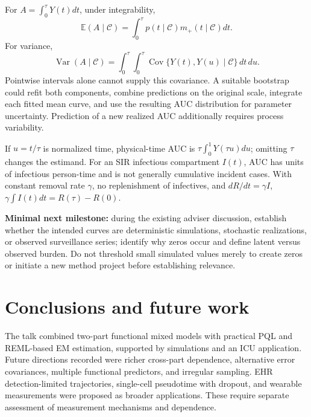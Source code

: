 \documentclass[11pt]{article}
\newcommand{\E}{\mathbb E}\newcommand{\Var}{\operatorname{Var}}\newcommand{\logit}{\operatorname{logit}}
\begin{document}
For $A=\int_0^\tau Y(t)dt$, under integrability,
\[
\E(A\mid\mathcal C)=\int_0^\tau p(t\mid\mathcal C)m_+(t\mid\mathcal C)dt.
\]
For variance,
\[
\Var(A\mid\mathcal C)=\int_0^\tau\int_0^\tau\operatorname{Cov}\{Y(t),Y(u)\mid\mathcal C\}\,dt\,du.
\]
Pointwise intervals alone cannot supply this covariance. A suitable bootstrap could refit both components, combine predictions on the original scale, integrate each fitted mean curve, and use the resulting AUC distribution for parameter uncertainty. Prediction of a new realized AUC additionally requires process variability.

If $u=t/\tau$ is normalized time, physical-time AUC is $\tau\int_0^1Y(\tau u)du$; omitting $\tau$ changes the estimand. For an SIR infectious compartment $I(t)$, AUC has units of infectious person-time and is not generally cumulative incident cases. With constant removal rate $\gamma$, no replenishment of infectives, and $dR/dt=\gamma I$, $\gamma\int I(t)dt=R(\tau)-R(0)$.

\textbf{Minimal next milestone:} during the existing adviser discussion, establish whether the intended curves are deterministic simulations, stochastic realizations, or observed surveillance series; identify why zeros occur and define latent versus observed burden. Do not threshold small simulated values merely to create zeros or initiate a new method project before establishing relevance.
\section{Conclusions and future work}
The talk combined two-part functional mixed models with practical PQL and REML-based EM estimation, supported by simulations and an ICU application. Future directions recorded were richer cross-part dependence, alternative error covariances, multiple functional predictors, and irregular sampling. EHR detection-limited trajectories, single-cell pseudotime with dropout, and wearable measurements were proposed as broader applications. These require separate assessment of measurement mechanisms and dependence.
\end{document}

